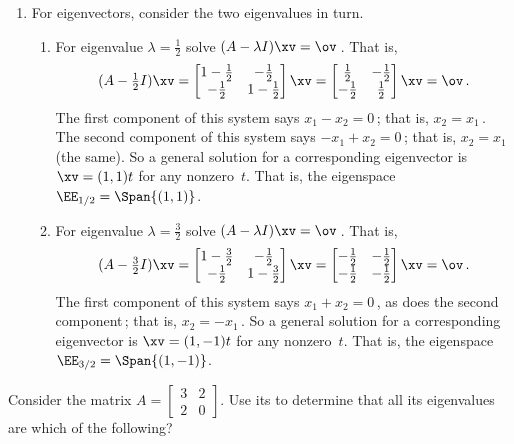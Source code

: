 \begin{example}
\begin{solution}
\begin{enumerate}
\item For eigenvectors, consider the two eigenvalues in turn.
\begin{enumerate}
\item For eigenvalue \(\lambda=\frac12\) solve \((A-\lambda I)\xv=\ov\)\,.  That is,
\begin{equation*}
(A-\tfrac12I)\xv
=\begin{bmatrix} 1-\frac12&-\frac12\\
-\frac12&1-\frac12 \end{bmatrix}\xv
=\begin{bmatrix} \frac12&-\frac12\\
-\frac12&\frac12 \end{bmatrix}\xv
=\ov\,.
\end{equation*}
The first component of this system says \(x_1-x_2=0\)\,; that is, \(x_2=x_1\)\,.  
The second component of this system says \(-x_1+x_2=0\)\,; that is, \(x_2=x_1\) (the same).  
So a general solution for a corresponding eigenvector is \(\xv=(1,1)t\) for any nonzero~\(t\).
That is, the eigenspace \(\EE_{1/2}=\Span \{(1,1)\}\).
\item For eigenvalue \(\lambda=\frac32\) solve \((A-\lambda I)\xv=\ov\)\,.  That is,
\begin{equation*}
(A-\tfrac32I)\xv
=\begin{bmatrix} 1-\frac32&-\frac12\\
-\frac12&1-\frac32 \end{bmatrix}\xv
=\begin{bmatrix} -\frac12&-\frac12\\
-\frac12&-\frac12 \end{bmatrix}\xv
=\ov\,.
\end{equation*}
The first component of this system says \(x_1+x_2=0\)\,, as does the second component\,; that is, \(x_2=-x_1\)\,.  
So a general solution for a corresponding eigenvector is \(\xv=(1,-1)t\) for any nonzero~\(t\).
That is, the eigenspace \(\EE_{3/2}=\Span \{(1,-1)\}\).
\end{enumerate}
\end{enumerate}
\end{solution}
\end{example}




\begin{activity}
Consider the matrix \(A=\begin{bmatrix} 3&2\\2&0 \end{bmatrix}\).  
Use its  to determine that all its eigenvalues are which of the following?
\end{activity}





